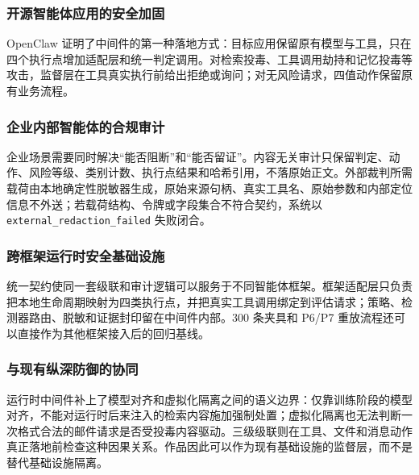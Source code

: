 \subsubsection{开源智能体应用的安全加固}

OpenClaw 证明了中间件的第一种落地方式：目标应用保留原有模型与工具，只在四个执行点增加适配层和统一判定调用。对检索投毒、工具调用劫持和记忆投毒等攻击，监督层在工具真实执行前给出拒绝或询问；对无风险请求，四值动作保留原有业务流程。

\subsubsection{企业内部智能体的合规审计}

企业场景需要同时解决“能否阻断”和“能否留证”。内容无关审计只保留判定、动作、风险等级、类别计数、执行点结果和哈希引用，不落原始正文。外部裁判所需载荷由本地确定性脱敏器生成，原始来源句柄、真实工具名、原始参数和内部定位信息不外送；若载荷结构、令牌或字段集合不符合契约，系统以 \verb|external_redaction_failed| 失败闭合。

\subsubsection{跨框架运行时安全基础设施}

统一契约使同一套级联和审计逻辑可以服务于不同智能体框架。框架适配层只负责把本地生命周期映射为四类执行点，并把真实工具调用绑定到评估请求；策略、检测器路由、脱敏和证据封印留在中间件内部。300 条夹具和 P6/P7 重放流程还可以直接作为其他框架接入后的回归基线。

\subsubsection{与现有纵深防御的协同}

\enlargethispage{3\baselineskip}

运行时中间件补上了模型对齐和虚拟化隔离之间的语义边界：仅靠训练阶段的模型对齐，不能对运行时后来注入的检索内容施加强制处置；虚拟化隔离也无法判断一次格式合法的邮件请求是否受投毒内容驱动。三级级联则在工具、文件和消息动作真正落地前检查这种因果关系。作品因此可以作为现有基础设施的监督层，而不是替代基础设施隔离。
